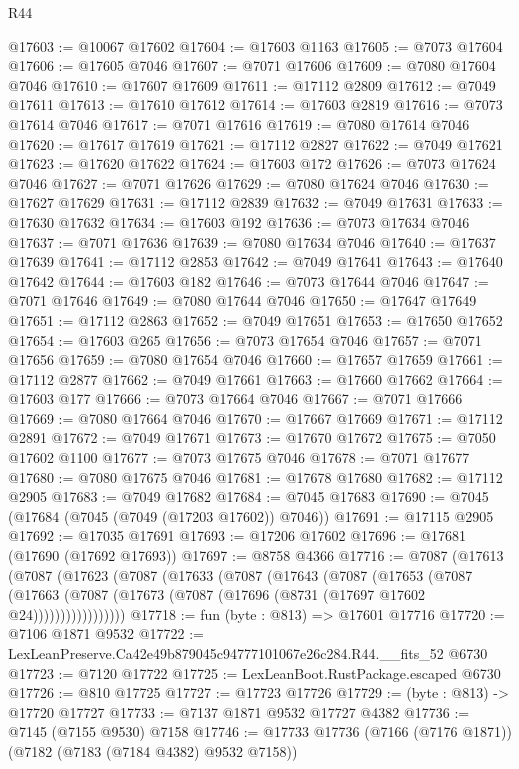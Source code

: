 \begin{lexlean}{R44}
\begin{coremodule}
{@17603 := @10067 @17602
@17604 := @17603 @1163
@17605 := @7073 @17604
@17606 := @17605 @7046
@17607 := @7071 @17606
@17609 := @7080 @17604 @7046
@17610 := @17607 @17609
@17611 := @17112 @2809
@17612 := @7049 @17611
@17613 := @17610 @17612
@17614 := @17603 @2819
@17616 := @7073 @17614 @7046
@17617 := @7071 @17616
@17619 := @7080 @17614 @7046
@17620 := @17617 @17619
@17621 := @17112 @2827
@17622 := @7049 @17621
@17623 := @17620 @17622
@17624 := @17603 @172
@17626 := @7073 @17624 @7046
@17627 := @7071 @17626
@17629 := @7080 @17624 @7046
@17630 := @17627 @17629
@17631 := @17112 @2839
@17632 := @7049 @17631
@17633 := @17630 @17632
@17634 := @17603 @192
@17636 := @7073 @17634 @7046
@17637 := @7071 @17636
@17639 := @7080 @17634 @7046
@17640 := @17637 @17639
@17641 := @17112 @2853
@17642 := @7049 @17641
@17643 := @17640 @17642
@17644 := @17603 @182
@17646 := @7073 @17644 @7046
@17647 := @7071 @17646
@17649 := @7080 @17644 @7046
@17650 := @17647 @17649
@17651 := @17112 @2863
@17652 := @7049 @17651
@17653 := @17650 @17652
@17654 := @17603 @265
@17656 := @7073 @17654 @7046
@17657 := @7071 @17656
@17659 := @7080 @17654 @7046
@17660 := @17657 @17659
@17661 := @17112 @2877
@17662 := @7049 @17661
@17663 := @17660 @17662
@17664 := @17603 @177
@17666 := @7073 @17664 @7046
@17667 := @7071 @17666
@17669 := @7080 @17664 @7046
@17670 := @17667 @17669
@17671 := @17112 @2891
@17672 := @7049 @17671
@17673 := @17670 @17672
@17675 := @7050 @17602 @1100
@17677 := @7073 @17675 @7046
@17678 := @7071 @17677
@17680 := @7080 @17675 @7046
@17681 := @17678 @17680
@17682 := @17112 @2905
@17683 := @7049 @17682
@17684 := @7045 @17683
@17690 := @7045 (@17684 (@7045 (@7049 (@17203 @17602)) @7046))
@17691 := @17115 @2905
@17692 := @17035 @17691
@17693 := @17206 @17602
@17696 := @17681 (@17690 (@17692 @17693))
@17697 := @8758 @4366
@17716 := @7087
    (@17613
      (@7087
        (@17623
          (@7087
            (@17633
              (@7087
                (@17643
                  (@7087
                    (@17653
                      (@7087
                        (@17663
                          (@7087 (@17673 (@7087 (@17696 (@8731 (@17697 @17602 @24)))))))))))))))))
@17718 := fun (byte : @813) => @17601 @17716
@17720 := @7106 @1871 @9532
@17722 := LexLeanPreserve.Ca42e49b879045c94777101067e26c284.R44.__fits_52 @6730
@17723 := @7120 @17722
@17725 := LexLeanBoot.RustPackage.escaped @6730
@17726 := @810 @17725
@17727 := @17723 @17726
@17729 := (byte : @813) -> @17720 @17727
@17733 := @7137 @1871 @9532 @17727 @4382
@17736 := @7145 (@7155 @9530) @7158
@17746 := @17733 @17736 (@7166 (@7176 @1871)) (@7182 (@7183 (@7184 @4382) @9532 @7158))
}
\end{coremodule}
\end{lexlean}
